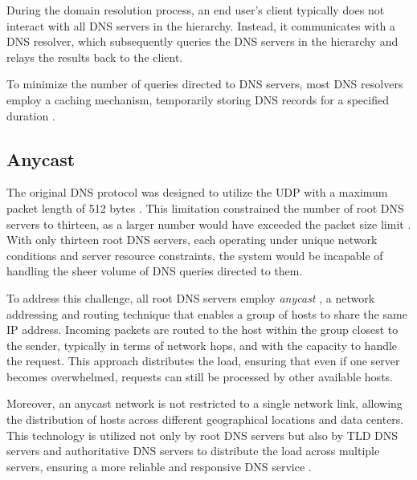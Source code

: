 During the domain resolution process, an end user's client typically does not interact with all DNS servers in the hierarchy.
Instead, it communicates with a DNS resolver, which subsequently queries the DNS servers in the hierarchy and relays the results back to the client.

To minimize the number of queries directed to DNS servers, most DNS resolvers employ a caching mechanism, temporarily storing DNS records for a specified duration \cite[126-127]{James_Kurose}.


\subsection{Anycast} \label{subsec:anycast}
The original DNS protocol was designed to utilize the \ac{UDP} with a maximum packet length of 512 bytes \cite{rfc1035}.
This limitation constrained the number of root DNS servers to thirteen, as a larger number would have exceeded the packet size limit \cite{markandrews}.
With only thirteen root DNS servers, each operating under unique network conditions and server resource constraints, the system would be incapable of handling the sheer volume of DNS queries directed to them.

To address this challenge, all root DNS servers employ \textit{anycast} \cite{rootserversorg}, a network addressing and routing technique that enables a group of hosts to share the same IP address.
Incoming packets are routed to the host within the group closest to the sender, typically in terms of network hops, and with the capacity to handle the request.
This approach distributes the load, ensuring that even if one server becomes overwhelmed, requests can still be processed by other available hosts.

Moreover, an anycast network is not restricted to a single network link, allowing the distribution of hosts across different geographical locations and data centers.
This technology is utilized not only by root DNS servers but also by \ac{TLD} DNS servers and authoritative DNS servers to distribute the load across multiple servers, ensuring a more reliable and responsive DNS service \cite{Sommese2021CharacterizationOA} \cite[406-407]{James_Kurose}.